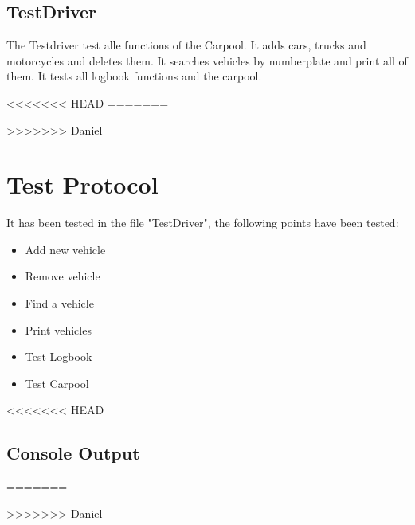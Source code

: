 \subsection{TestDriver}
The Testdriver test alle functions of the Carpool. It adds cars, trucks and motorcycles and deletes them.
It searches vehicles by numberplate and print all of them. It tests all logbook functions and the carpool.

<<<<<<< HEAD
=======

\newpage
>>>>>>> Daniel
\section{Test Protocol}
It has been tested in the file "TestDriver", the following points have been tested:
\begin{itemize}
	\item Add new vehicle
	\item Remove vehicle
	\item Find a vehicle
	\item Print vehicles
	\item Test Logbook
	\item Test Carpool
\end{itemize}

<<<<<<< HEAD
\subsection{Console Output}

=======


\newpage
>>>>>>> Daniel
